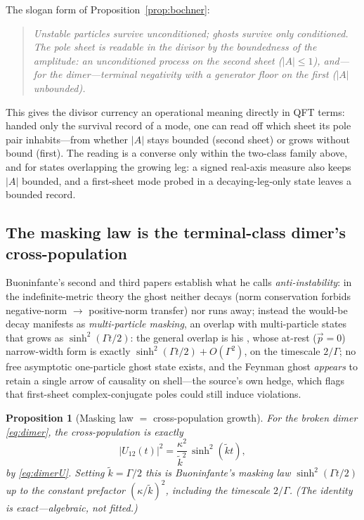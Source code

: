 \documentclass[11pt]{article}
\newtheorem{proposition}[theorem]{Proposition}
\theoremstyle{definition}
\theoremstyle{remark}
\newcommand{\wt}{\widetilde{k}}
\begin{document}
The slogan form of Proposition~\ref{prop:bochner}:
\begin{quote}
\emph{Unstable particles survive unconditioned; ghosts survive only
conditioned. The pole sheet is readable in the divisor by the \emph{boundedness} of
the amplitude: an unconditioned process on the second sheet
($|A|\le1$), and---for the dimer---terminal negativity with a generator
floor on the first ($|A|$ unbounded).}
\end{quote}
This gives the divisor currency an operational meaning directly in
QFT terms: handed only the survival record of a mode, one can read
off which sheet its pole pair inhabits---from whether $|A|$ stays
bounded (second sheet) or grows without bound (first). The reading is
a converse only within the two-class family above, and for states
overlapping the growing leg: a signed real-axis measure also keeps
$|A|$ bounded, and a first-sheet mode probed in a decaying-leg-only
state leaves a bounded record.

\subsection{The masking law is the terminal-class dimer's cross-population}
\label{sec:masking}

Buoninfante's second and third papers establish what he calls
\emph{anti-instability}: in the indefinite-metric theory the ghost
neither decays (norm conservation forbids negative-norm $\to$
positive-norm transfer) nor runs away; instead the would-be decay
manifests as \emph{multi-particle masking}, an overlap with
multi-particle states that grows as
$\sinh^{2}(\Gamma t/2)$: the general overlap is his
\cite[Eq.~(84)]{BuoninfanteP2}, whose at-rest ($\vec p=0$)
narrow-width form \cite[Eq.~(88)]{BuoninfanteP2} is exactly
$\sinh^{2}(\Gamma t/2)+O(\Gamma^{2})$, on the timescale $2/\Gamma$; no free
asymptotic one-particle ghost state exists, and the Feynman ghost
\emph{appears} to retain a single arrow of causality on shell---the
source's own hedge, which flags that first-sheet complex-conjugate
poles could still induce violations.

\begin{proposition}[Masking law $=$ cross-population growth]
\label{prop:masking}
For the broken dimer \eqref{eq:dimer}, the cross-population is
exactly
\[
|U_{12}(t)|^{2}=\frac{\kappa^{2}}{\wt^{2}}\,\sinh^{2}(\wt t),
\]
by \eqref{eq:dimerU}. Setting $\wt=\Gamma/2$ this is Buoninfante's
masking law $\sinh^{2}(\Gamma t/2)$ up to the constant prefactor
$(\kappa/\wt)^{2}$, including the timescale $2/\Gamma$. (The identity
is exact---algebraic, not fitted.)
\end{proposition}
\end{document}
